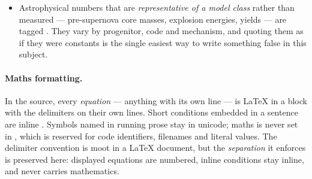 \begin{itemize}
  ``prediction'' in \S\ref{sec:ignition} was a bookkeeping identity; the
  two-group QSE picture is Woosley, Arnett \& Clayton 1973's, not BCF68's, and
  the (p,$\gamma$) bottleneck is WAC73/HT96's, not the
  NNN paper's (\S\ref{sec:twoclusters}); the NNN's architecture is 12/9 layers of
  1024/2048, not the code's 4-layer default, and its author list is Grichener,
  Renzo, Kerzendorf et al.\ (\S\ref{sec:nnnis}); the NuGNN column of the novelty
  table understated that paper (\S\ref{sec:decodestep}, \S\ref{sec:nugnn});
  Ovadia et al.\ 2019 was cited against its own conclusion
  (\S\ref{sec:calibrated}, ); the binomial in \S\ref{sec:multiplicity}
  (5\% is $\ge 63/108$, not $\ge 60$); and the ``${\approx}75\%$'' premise of
   is sourced (WAC73 via HT96) but for a different quantity.
  Pre-arXiv classics were verified only bibliographically this session (ADS
  abstract pages were unreachable; CrossRef/INSPIRE and cached bibliographies
  were used) --- their content is marked ASSUMED-with-attribution where no cached
  secondary states it. Part~0 leans on the CCSN and nucleosynthesis literature
  more heavily than any earlier tier; the References provenance notes say,
  entry by entry, what was actually opened.
\item Astrophysical numbers that are \emph{representative of a model class}
  rather than measured --- pre-supernova core masses, explosion energies,
   yields --- are tagged \typical. They vary by progenitor, code and
  mechanism, and quoting them as if they were constants is the single easiest
  way to write something false in this subject.
\end{itemize}

\paragraph{Maths formatting.} In the source, every \emph{equation} --- anything
with its own line --- is \LaTeX{} in a \code{\$\$ \ldots \$\$} block with the
delimiters on their own lines. Short conditions embedded in a sentence are
inline \code{\$\ldots\$}. Symbols named in running prose stay in unicode; maths
is never set in , which is reserved for code identifiers,
filenames and literal values. The delimiter convention is moot in a \LaTeX{}
document, but the \emph{separation} it enforces is preserved here: displayed
equations are numbered, inline conditions stay inline, and 
never carries mathematics.

